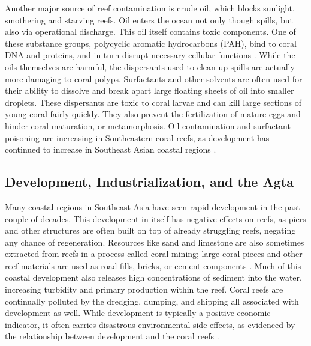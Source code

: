 \documentclass{book}\usepackage{knitr}
\begin{document}
Another major source of reef contamination is crude oil, which blocks sunlight, smothering and starving reefs. Oil enters the ocean not only though spills, but also via operational discharge. This oil itself contains toxic components. One of these substance groups, polycyclic aromatic hydrocarbons (PAH), bind to coral DNA and proteins, and in turn disrupt necessary cellular functions \citep{4884777420100401}. While the oils themselves are harmful, the dispersants used to clean up spills are actually more damaging to coral polyps. Surfactants and other solvents are often used for their ability to dissolve and break apart large floating sheets of oil into smaller droplets. These dispersants are toxic to coral larvae and can kill large sections of young coral fairly quickly. They also prevent the fertilization of mature eggs and hinder coral maturation, or metamorphosis. Oil contamination and surfactant poisoning are increasing in Southeastern coral reefs, as development has continued to increase in Southeast Asian coastal regions \citep{2615280620070801}.

\subsection{Development, Industrialization, and the Agta}

Many coastal regions in Southeast Asia have seen rapid development in the past couple of decades. This development in itself has negative effects on reefs, as piers and other structures are often built on top of already struggling reefs, negating any chance of regeneration. Resources like sand and limestone are also sometimes extracted from reefs in a process called coral mining; large coral pieces and other reef materials are used as road fills, bricks, or cement components \citep{coralreefalliance_2021}. Much of this coastal development also releases high concentrations of sediment into the water, increasing turbidity and primary production within the reef. Coral reefs are continually polluted by the dredging, dumping, and shipping all associated with development as well. While development is typically a positive economic indicator, it often carries disastrous environmental side effects, as evidenced by the relationship between development and the coral reefs \citep{USEPA_2017}.
\end{document}
